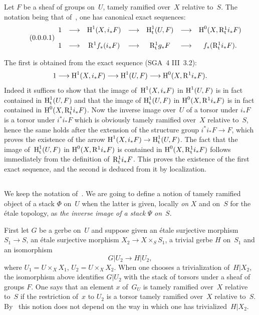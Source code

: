 \subsubsection{}
\label{XIII.2.1.6}
Let
$F$ be a sheaf of groups on~$U$, tamely
ramified over~$X$ relative to~$S$. The notation being
that of~, one has canonical exact sequences:
\begin{equation*}
\label{eq:XIII.2.1.6.1}
\tag{\thesubsubsection.1}
\begin{array}{ccccccc}
1 & \longrightarrow & \H^1(X,i_*F)& \longrightarrow & \H^1_{\tame}(U,F) &
\longrightarrow & \H^0(X,\R^1_{\tame} i_*F)\\[10pt] 1 &
\longrightarrow & \R^1f_*(i_*F) & \longrightarrow & \R^1_{\tame}g_*F &
\longrightarrow & f_*(\R^1_{\tame}i_*F).\end{array}
\end{equation*}

The first is obtained from the exact sequence
(SGA~4 III~3.2):
$$
1\to \H^1(X,i_*F)\to \H^1(U,F)\to
\H^0(X,\R^1i_*F).
$$
Indeed it suffices to show that the image of~$\operatorname{H}^1(X,i_*F)$ in
$\operatorname{H}^1(U,F)$ is in fact contained in $\operatorname{H}^1_{\mathrm{t}}(U,F)$ and that the image of
$\operatorname{H}^1_{\mathrm{t}}(U,F)$ in $\operatorname{H}^0(X,\mathrm{R}^1i_*F)$ is in fact contained in
$\operatorname{H}^0(X,\mathrm{R}^1_{\mathrm{t}}i_*F)$. Now the inverse image over~$U$ of a torsor under
$i_*F$ is a torsor under $i^*i_*F$ which is obviously
tamely ramified over~$X$ relative to~$S$, hence the same
holds after the extension of the structure group
$i^*i_*F\to F$, which proves the existence of the arrow
$\H^1(X,i_*F)\to\H^1_{\tame}(U,F)$. The fact that the image of~$\operatorname{H}^1_{\mathrm{t}}(U,F)$
in $\operatorname{H}^0(X,\mathrm{R}^1i_*F)$ is contained in $\operatorname{H}^0(X,\mathrm{R}^1_{\mathrm{t}}i_*F)$
follows immediately from the definition of~$\mathrm{R}^1_{\mathrm{t}}i_*F$. This
proves the existence of the first exact sequence, and the second
is deduced from it by localization.

\subsection{}
\label{XIII.2.2}
We keep the notation of~. We are going to define
a notion of tamely ramified object of a stack $\Phi$
on~$U$ when the latter is given, locally \emph{on} $X$ and
on~$S$ for the étale topology, as \emph{the inverse image of a
stack} $\Psi$ \emph{on}~$S$.

First let $G$ be a gerbe on~$U$ and suppose given an
étale surjective morphism $S_1\to S$, an étale surjective morphism
$X_2\to X\times_S S_1$, a trivial gerbe $H$ on~$S_1$ and an
isomorphism
$$
G|{U_2}\to H|{U_2},
$$
where
$U_1=U\times_X X_1$, $U_2=U\times_X X_2$. When one chooses a
trivialization of~$H|{X_2}$, the isomorphism above identifies
$G|{U_2}$ with the stack of torsors under a sheaf of groups $F$. One
says that an element $x$ of~$G_U$ is tamely
ramified over~$X$ relative
to~$S$
if the restriction of~$x$
to $U_2$ is a torsor tamely ramified over~$X$
relative to~$S$. By~ this notion does not
depend on the way in which one has trivialized~$H|X_2$.

